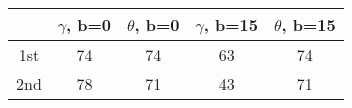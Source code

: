 \begin{tabular}{ccccc}
\hline
 & $\gamma$, b=0 &  $\theta$, b=0 &  $\gamma$, b=15 & $\theta$, b=15  \\
\hline
1st &  74 & 74 & 63 & 74  \\
2nd & 78 & 71 & 43 & 71 \\

\hline
\end{tabular}